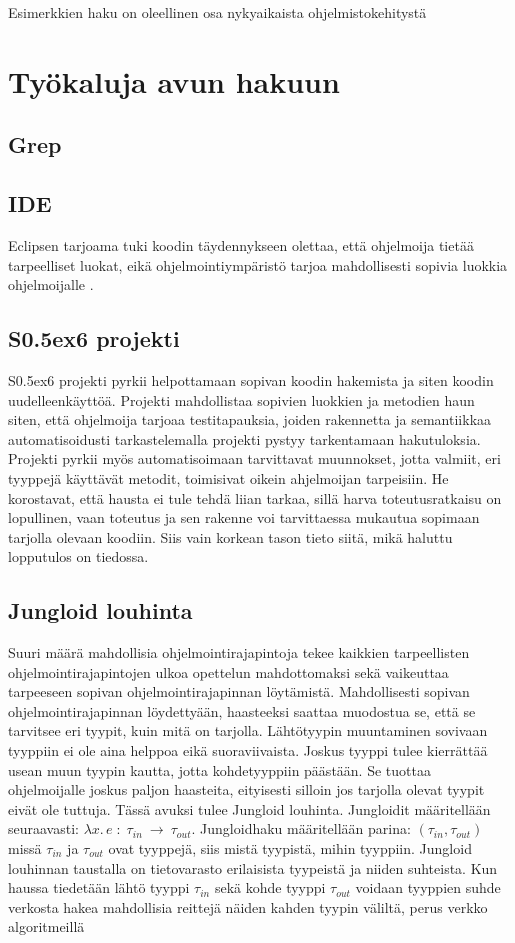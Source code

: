 \documentclass[finnish]{../tktltiki2}
\theoremstyle{definition}
\theoremstyle{remark}
\begin{document}
Esimerkkien haku on oleellinen osa nykyaikaista ohjelmistokehitystä \cite{example-overflow-social-media-for-code-recommendations}

\section{Työkaluja avun hakuun}
\subsection{Grep}
\subsection{IDE}
Eclipsen tarjoama tuki koodin täydennykseen olettaa, että ohjelmoija tietää tarpeelliset luokat, eikä ohjelmointiympäristö tarjoa mahdollisesti sopivia luokkia ohjelmoijalle \cite{jungloid-mining}.
\subsection{S\raise0.5ex\hbox{6} projekti}
S\raise0.5ex\hbox{6} projekti pyrkii helpottamaan sopivan koodin hakemista ja siten koodin uudelleenkäyttöä. Projekti mahdollistaa sopivien luokkien ja metodien haun siten, että ohjelmoija tarjoaa testitapauksia, joiden rakennetta ja semantiikkaa automatisoidusti tarkastelemalla projekti pystyy tarkentamaan hakutuloksia. Projekti pyrkii myös automatisoimaan tarvittavat muunnokset, jotta valmiit, eri tyyppejä käyttävät metodit, toimisivat oikein ahjelmoijan tarpeisiin. He korostavat, että hausta ei tule tehdä liian tarkaa, sillä harva toteutusratkaisu on lopullinen, vaan toteutus ja sen rakenne voi tarvittaessa mukautua sopimaan tarjolla olevaan koodiin. Siis vain korkean tason tieto siitä, mikä haluttu lopputulos on tiedossa. \cite{what-to-search-for}

\subsection{Jungloid louhinta}
Suuri määrä mahdollisia ohjelmointirajapintoja tekee kaikkien tarpeellisten ohjelmointirajapintojen ulkoa opettelun mahdottomaksi sekä vaikeuttaa tarpeeseen sopivan ohjelmointirajapinnan löytämistä. Mahdollisesti sopivan ohjelmointirajapinnan löydettyään, haasteeksi saattaa muodostua se, että se tarvitsee eri tyypit, kuin mitä on tarjolla. Lähtötyypin muuntaminen sovivaan tyyppiin ei ole aina helppoa eikä suoraviivaista. Joskus tyyppi tulee kierrättää usean muun tyypin kautta, jotta kohdetyyppiin päästään. Se tuottaa ohjelmoijalle joskus paljon haasteita, eityisesti silloin jos tarjolla olevat tyypit eivät ole tuttuja. Tässä avuksi tulee Jungloid louhinta.
Jungloidit määritellään seuraavasti: $ \lambda x.\, e\; :\; \tau_{in}\:\to\:\tau_{out}$. Jungloidhaku määritellään parina: $(\tau_{in}, \tau_{out})$ missä $\tau_{in}$ ja $\tau_{out}$ ovat tyyppejä, siis mistä tyypistä, mihin tyyppiin. Jungloid louhinnan taustalla on tietovarasto erilaisista tyypeistä ja niiden suhteista. Kun haussa tiedetään lähtö tyyppi $\tau_{in}$ sekä kohde tyyppi $\tau_{out}$ voidaan tyyppien suhde verkosta hakea mahdollisia reittejä näiden kahden tyypin väliltä, perus verkko algoritmeillä \cite{jungloid-mining}
\end{document}
